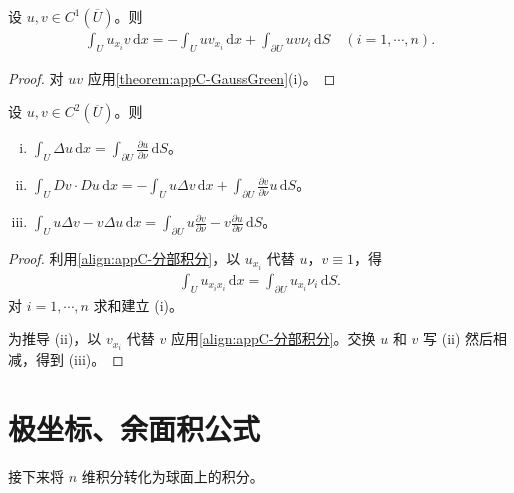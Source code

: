 \documentclass[../main.tex]{subfiles}
\begin{document}
\begin{theorem}[分部积分公式。]\label{theorem:appC-分部积分}设 $u,v\in C^1(\overline{U})$。则
\begin{align}
\int_U u_{x_i}v\,\mathrm{d}x=-\int_U uv_{x_i}\,\mathrm{d}x+\int_{\partial U}uv\nu_i\,\mathrm{d}S \quad (i=1,\cdots,n).
\label{align:appC-分部积分}
\end{align}
\end{theorem}

\begin{proof}
对 $uv$ 应用\cref{theorem:appC-GaussGreen}(i)。
\end{proof}

\begin{theorem}[Green 公式。]\label{theorem:appC-Green公式}设 $u,v\in C^2(\overline{U})$。则
\begin{enumerate}[(i)]
\item $\displaystyle\int_U\Delta u\,\mathrm{d}x=\int_{\partial U}\frac{\partial u}{\partial\nu}\,\mathrm{d}S$。
\item $\displaystyle\int_U Dv\cdot Du\,\mathrm{d}x=-\int_U u\Delta v\,\mathrm{d}x+\int_{\partial U}\frac{\partial v}{\partial\nu}u\,\mathrm{d}S$。
\item $\displaystyle\int_U u\Delta v-v\Delta u\,\mathrm{d}x=\int_{\partial U}u\frac{\partial v}{\partial\nu}-v\frac{\partial u}{\partial\nu}\,\mathrm{d}S$。
\end{enumerate}
\end{theorem}

\begin{proof}
利用\eqref{align:appC-分部积分}，以 $u_{x_i}$ 代替 $u$，$v\equiv 1$，得
\begin{align*}
\int_U u_{x_ix_i}\,\mathrm{d}x=\int_{\partial U}u_{x_i}\nu_i\,\mathrm{d}S.
\end{align*}
对 $i=1,\cdots,n$ 求和建立 (i)。

为推导 (ii)，以 $v_{x_i}$ 代替 $v$ 应用\eqref{align:appC-分部积分}。交换 $u$ 和 $v$ 写 (ii) 然后相减，得到 (iii)。
\end{proof}

\section{极坐标、余面积公式}\label{section:appC-极坐标}

接下来将 $n$ 维积分转化为球面上的积分。
\end{document}
